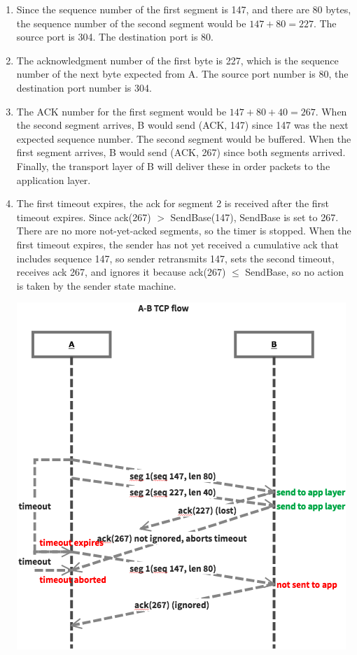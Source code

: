 \documentclass[letter,10pt]{article}
\begin{document}
\begin{enumerate}[label=\alph*)]
	\item Since the sequence number of the first segment is 147, and there are 80 bytes, the sequence number of the second segment would be $147 + 80 = 227$. The source port is 304. The destination port is 80.
	
	\item The acknowledgment number of the first byte is 227, which is the sequence number of the next byte expected from A. The source port number is 80, the destination port number is 304.

	\item  The ACK number for the first segment would be $147 + 80 + 40 = 267$. When the second segment arrives, B would send (ACK, 147) since 147 was the next expected sequence number. The second segment would be buffered. When the first segment arrives, B would send (ACK, 267) since both segments arrived. Finally, the transport layer of B will deliver these in order packets to the application layer.
	
	\item The first timeout expires, the ack for segment 2 is received after the first timeout expires. Since ack(267) $>$ SendBase(147), SendBase is set to 267. There are no more not-yet-acked segments, so the timer is stopped. When the first timeout expires, the sender has not yet received a cumulative ack that includes sequence 147, so sender retransmits 147, sets the second timeout, receives ack 267, and ignores it because ack(267) $\leq$ SendBase, so no action is taken by the sender state machine.
		\begin{center}
			\noindent \includegraphics[height=.6\textheight]{./figures/5d}
		\end{center}		
\end{enumerate}
\end{document}
